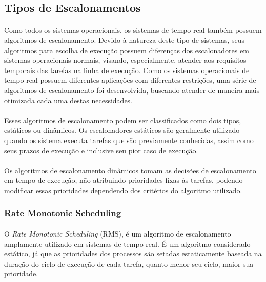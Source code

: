 \subsection{Tipos de Escalonamentos}
\paragraph{}
Como todos os sistemas operacionais, os sistemas de tempo real também possuem algoritmos de escalonamento.
Devido à natureza deste tipo de sistemas, seus algoritmos para escolha de execução possuem diferenças
dos escalonadores em sistemas operacionais normais, visando, especialmente, atender aos requisitos temporais
das tarefas na linha de execução. Como os sistemas operacionais de tempo real possuem diferentes aplicações
com diferentes restrições, uma série de algoritmos de escalonamento foi desenvolvida, buscando atender de
maneira mais otimizada cada uma destas necessidades.
\paragraph{}
Esses algoritmos de escalonamento podem ser classificados como dois tipos, estáticos ou dinâmicos.
Os escalonadores estáticos são geralmente utilizado quando os sistema executa tarefas que são previamente
conhecidas, assim como seus prazos de execução e inclusive seu pior caso de execução.
\paragraph{}
Os algoritmos de escalonamento dinâmicos tomam as decisões de escalonamento em tempo de execução, não
atribuindo prioridades fixas às tarefas, podendo modificar essas prioridades dependendo dos critérios
do algoritmo utilizado.

\subsubsection{Rate Monotonic Scheduling}
\paragraph{}
O \textit{Rate Monotonic Scheduling} (RMS), é um algoritmo de escalonamento amplamente utilizado em sistemas
de tempo real. É um algoritmo considerado estático, já que as prioridades dos processos são setadas estaticamente
baseada na duração do ciclo de execução de cada tarefa, quanto menor seu ciclo, maior sua prioridade.

